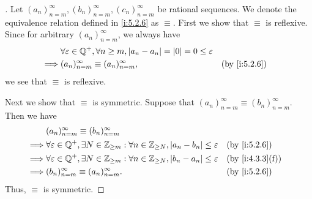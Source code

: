 \begin{proof}[]
  Let \((a_n)_{n = m}^\infty, (b_n)_{n = m}^\infty, (c_n)_{n = m}^\infty\) be rational sequences.
  We denote the equivalence relation defined in \cref{i:5.2.6} as \(\equiv\).
  First we show that \(\equiv\) is reflexive.
  Since for arbitrary \((a_n)_{n = m}^\infty\), we always have
  \begin{align*}
             & \forall \varepsilon \in \Q^+, \forall n \geq m, \abs{a_n - a_n} = \abs{0} = 0 \leq \varepsilon                   \\
    \implies & (a_n)_{n = m}^\infty \equiv (a_n)_{n = m}^\infty,                                              &  & \by{i:5.2.6}
  \end{align*}
  we see that \(\equiv\) is reflexive.

  Next we show that \(\equiv\) is symmetric.
  Suppose that \((a_n)_{n = m}^\infty \equiv (b_n)_{n = m}^\infty\).
  Then we have
  \begin{align*}
             & (a_n)_{n = m}^\infty \equiv (b_n)_{n = m}^\infty                                                                                          \\
    \implies & \forall \varepsilon \in \Q^+, \exists N \in \Z_{\geq m}: \forall n \in \Z_{\geq N}, \abs{a_n - b_n} \leq \varepsilon &  & \by{i:5.2.6}    \\
    \implies & \forall \varepsilon \in \Q^+, \exists N \in \Z_{\geq m}: \forall n \in \Z_{\geq N}, \abs{b_n - a_n} \leq \varepsilon &  & \by{i:4.3.3}[f] \\
    \implies & (b_n)_{n = m}^\infty \equiv (a_n)_{n = m}^\infty.                                                                    &  & \by{i:5.2.6}
  \end{align*}
  Thus, \(\equiv\) is symmetric.


\end{proof}
